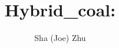 \documentclass[12pt]{article}
\begin{document}
\title{Hybrid\_coal: }
\author{Sha (Joe) Zhu}
\maketitle


\nocite{Zhu2011poster}

\end{document}
